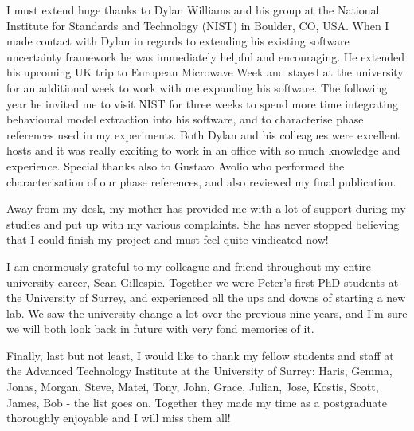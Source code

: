 \documentclass[../thesis/thesis.tex]{subfiles}
\begin{document}
I must extend huge thanks to Dylan Williams and his group at the National Institute for Standards and Technology (NIST) in Boulder, CO, USA. When I made contact with Dylan in regards to extending his existing software uncertainty framework he was immediately helpful and encouraging. He extended his upcoming UK trip to European Microwave Week and stayed at the university for an additional week to work with me expanding his software. The following year he invited me to visit NIST for three weeks to spend more time integrating behavioural model extraction into his software, and to characterise phase references used in my experiments. Both Dylan and his colleagues were excellent hosts and it was really exciting to work in an office with so much knowledge and experience. Special thanks also to Gustavo Avolio who performed the characterisation of our phase references, and also reviewed my final publication.

Away from my desk, my mother has provided me with a lot of support during my studies and put up with my various complaints. She has never stopped believing that I could finish my project and must feel quite vindicated now!

I am enormously grateful to my colleague and friend throughout my entire university career, Sean Gillespie. Together we were Peter's first PhD students at the University of Surrey, and experienced all the ups and downs of starting a new lab. We saw the university change a lot over the previous nine years, and I'm sure we will both look back in future with very fond memories of it.

Finally, last but not least, I would like to thank my fellow students and staff at the Advanced Technology Institute at the University of Surrey: Haris, Gemma, Jonas, Morgan, Steve, Matei, Tony, John, Grace, Julian, Jose, Kostis, Scott, James, Bob - the list goes on. Together they made my time as a postgraduate thoroughly enjoyable and I will miss them all!

\newpage
\tableofcontents
{}

\newpage
{}
\listoffigures
\newpage
{}
\listoftables

\glsaddall
\printunsrtglossary[title=List of Abbreviations]

\end{document}
